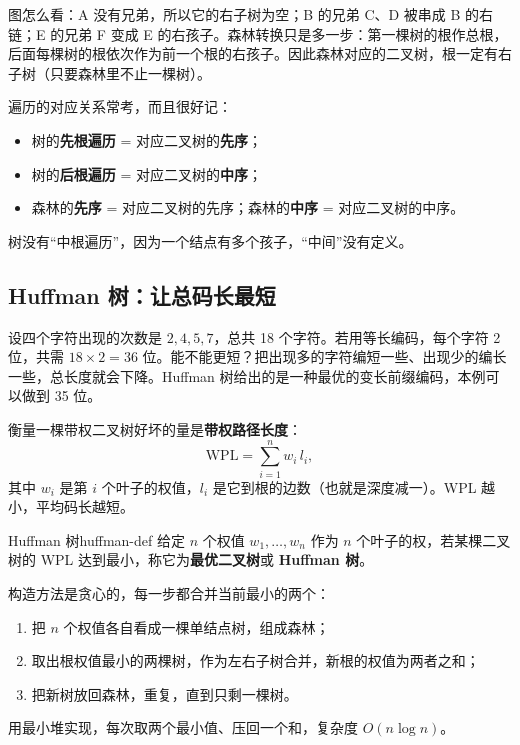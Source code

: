 图怎么看：A 没有兄弟，所以它的右子树为空；B 的兄弟 C、D 被串成 B 的右链；E 的兄弟 F 变成 E 的右孩子。森林转换只是多一步：第一棵树的根作总根，后面每棵树的根依次作为前一个根的右孩子。因此森林对应的二叉树，根一定有右子树（只要森林里不止一棵树）。

遍历的对应关系常考，而且很好记：
\begin{itemize}
  \item 树的\textbf{先根遍历} = 对应二叉树的\textbf{先序}；
  \item 树的\textbf{后根遍历} = 对应二叉树的\textbf{中序}；
  \item 森林的\textbf{先序} = 对应二叉树的先序；森林的\textbf{中序} = 对应二叉树的中序。
\end{itemize}
树没有“中根遍历”，因为一个结点有多个孩子，“中间”没有定义。

\subsection{Huffman 树：让总码长最短}

设四个字符出现的次数是 $2,4,5,7$，总共 18 个字符。若用等长编码，每个字符 2 位，共需 $18\times2=36$ 位。能不能更短？把出现多的字符编短一些、出现少的编长一些，总长度就会下降。Huffman 树给出的是一种最优的变长前缀编码，本例可以做到 35 位。

衡量一棵带权二叉树好坏的量是\textbf{带权路径长度}：
\[
\mathrm{WPL}=\sum_{i=1}^{n} w_i\,l_i ,
\]
其中 $w_i$ 是第 $i$ 个叶子的权值，$l_i$ 是它到根的边数（也就是深度减一）。WPL 越小，平均码长越短。

\begin{mydef}{Huffman 树}{huffman-def}
给定 $n$ 个权值 $w_1,\ldots,w_n$ 作为 $n$ 个叶子的权，若某棵二叉树的 WPL 达到最小，称它为\textbf{最优二叉树}或 \textbf{Huffman 树}。
\end{mydef}

构造方法是贪心的，每一步都合并当前最小的两个：
\begin{enumerate}
  \item 把 $n$ 个权值各自看成一棵单结点树，组成森林；
  \item 取出根权值最小的两棵树，作为左右子树合并，新根的权值为两者之和；
  \item 把新树放回森林，重复，直到只剩一棵树。
\end{enumerate}
用最小堆实现，每次取两个最小值、压回一个和，复杂度 $O(n\log n)$。

